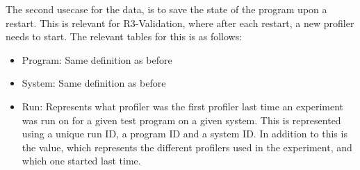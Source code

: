 The second usecase for the data, is to save the state of the program upon a restart. This is relevant for R3-Validation, where after each restart, a new profiler needs to start. The relevant tables for this is as follows:

\begin{itemize}
    \item Program: Same definition as before
    \item System: Same definition as before
    \item Run: Represents what profiler was the first profiler last time an experiment was run on for a given test program on a given system. This is represented using a unique run ID, a program ID and a system ID. In addition to this is the value, which represents the different profilers used in the experiment, and which one started last time.
\end{itemize}

